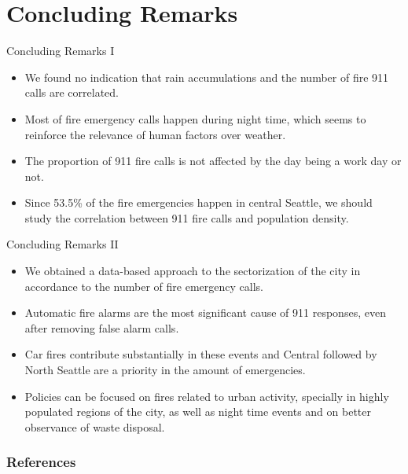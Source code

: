 \documentclass[t,11pt,compress,xcolor=table,hyperref={bookmarks=false}]{beamer}
\begin{document}
\section{Concluding Remarks}

\begin{frame}{Concluding Remarks I}
\begin{itemize}
\large
\item We found no indication that rain accumulations and the number of fire 911 calls are correlated.

\item Most of fire emergency calls happen during night time, which seems to reinforce the relevance of human factors over weather.

\item The proportion of 911 fire calls is not affected by the day being a work day or not.

\item Since 53.5\% of the fire emergencies happen in central Seattle, we should study the correlation between 911 fire calls and population density.
\end{itemize}
\end{frame}


\begin{frame}{Concluding Remarks II}
\begin{itemize}
\large
\item We obtained a data-based approach to the sectorization of the city in accordance to the number of fire emergency calls.

\item Automatic fire alarms are the most significant cause of 911 responses, even after removing false alarm calls.

\item Car fires contribute substantially in these events and Central followed by North Seattle are a priority in the amount of emergencies.

\item Policies can be focused on fires related to urban activity, specially in highly populated regions of the city, as well as night time events and on better observance of waste disposal.
\end{itemize}
\end{frame}

\begin{frame}[allowframebreaks]
\frametitle{References}


\end{frame}
\end{document}
